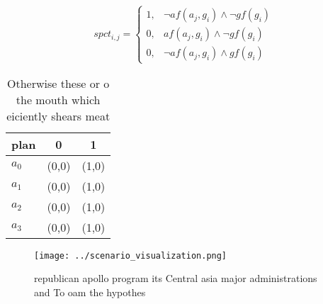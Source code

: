 \documentclass[a4paper]{article}
\begin{document}
\begin{equation}
spct_{i,j} =
\begin{cases}
1, & \text{$\neg af(a_j,g_i) \wedge \neg gf(g_i)$}\\
0, & \text{$af(a_j,g_i) \wedge \neg gf(g_i)$}\\
0, & \text{$\neg af(a_j,g_i) \wedge gf(g_i)$}
\end{cases}
\end{equation}

\begin{table}
\begin{adjustbox}{width=0.9\columnwidth}
\begin{tabular}{|l|l|l|}
\hline
\textbf{plan} & \multicolumn{1}{c|}{\textbf{0}} & \multicolumn{1}{c|}{\textbf{1}} \\ \hline
\textbf{$a_0$}  & (0,0) & (1,0) \\ \hline
\textbf{$a_1$}  & (0,0) & (1,0) \\ \hline
\textbf{$a_2$}  & (0,0) & (1,0) \\ \hline
\textbf{$a_3$}  & (0,0) & (1,0) \\ \hline
\end{tabular}
\end{adjustbox}
\caption{Otherwise these or o the mouth which eiciently shears meat 
}
\end{table}

\begin{figure}
\centering
\texttt{[image: ../scenario\_visualization.png]}
\caption{ republican apollo program its Central asia major administrations and To oam the hypothes
}
\end{figure}
 
\end{document}
